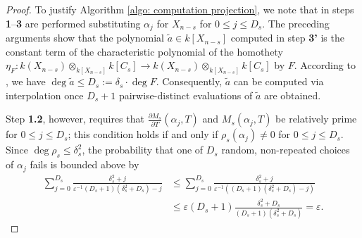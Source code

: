 \documentclass[pdflatex,sn-basic]{sn-jnl}%
\theoremstyle{thmstyleone}%
\theoremstyle{thmstyletwo}%
\theoremstyle{thmstylethree}%
\theoremstyle{definition}
\numberwithin{equation}{section}
\begin{document}
\begin{proof}
To justify Algorithm \ref{algo: computation projection}, we note
that in steps {\bf 1}--{\bf 3} are performed substituting $\alpha_j$
for $X_{n-s}$
for $0\le j\le D_s$. %
The preceding arguments show that the polynomial $\widetilde{a}\in
k[X_{n-s}]$ computed in step {\bf 3'} is the constant term of the
characteristic polynomial of the homothety
$\eta_F:k(X_{n-s})\otimes_{k[X_{n-s}]} k[C_s]\to
k(X_{n-s})\otimes_{k[X_{n-s}]} k[C_s]$ by $F$. According to
\cite[Corollary 2]{GiLeSa01}, we have $\deg \widetilde{a}\le
D_s:=\delta_s\cdot\deg F$. Consequently, $\widetilde{a}$ can be
computed via interpolation once $D_s+1$ pairwise-distinct
evaluations of $\widetilde{a}$ are obtained.

Step {\bf 1.2}, however,
requires that $\frac{\partial M_s}{\partial T}(\alpha_j,T)$ and
$M_s(\alpha_j,T)$ be relatively prime for $0\le j\le D_s$; this
condition holds if and only if $\rho_s(\alpha_j)\not=0$ for $0\le
j\le D_s$. Since $\deg\rho_s\le \delta_s^2$, the  probability that one
of $D_s$ random, non-repeated choices
of $\alpha_j$ fails is bounded above by
%
\begin{align*}
\sum_{j=0}^{D_s}\frac{\delta_s^2+j}{\varepsilon^{-1}(D_s+1)(\delta_s^2+D_s)-j}&\le
\sum_{j=0}^{D_s}\frac{\delta_s^2+j}{\varepsilon^{-1}((D_s+1)(\delta_s^2+D_s)-j)}
\\&\le
\varepsilon(D_s+1)\frac{\delta_s^2+D_s}{(D_s+1)(\delta_s^2+D_s)}=
\varepsilon.\end{align*}
%
\end{proof}
\end{document}
